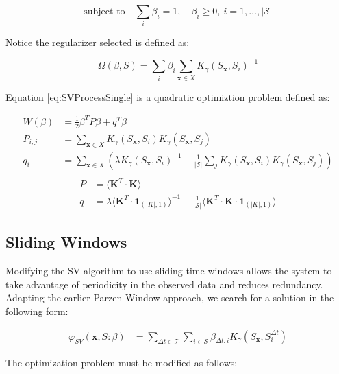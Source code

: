 \documentclass[10pt]{article}
\begin{document}
\begin{equation} \label{eq:SVProcessSingle} \text{subject to} \quad \sum_i \beta_i = 1, \quad \beta_i \ge 0, \ i=1,\hdots,|\mathcal{S}|
\end{equation}

Notice the regularizer selected is defined as:

\begin{equation}
\Omega(\beta,S) = \sum_i \beta_i \sum_{\mathbf{x} \in X} K_\gamma(S_{\mathbf{x}},S_i)^{-1}
\end{equation}

Equation \ref{eq:SVProcessSingle} is a quadratic optimiztion problem defined as:

\begin{align*}
W(\beta) &= \frac{1}{2} \beta^T P \beta + q^T \beta \\
P_{i,j} &= \sum_{\mathbf{x} \in X } K_\gamma(S_{\mathbf{x}},S_i) K_\gamma(S_{\mathbf{x}},S_j) \\
q_i &= \sum_{\mathbf{x} \in X } \left( \lambda K_\gamma(S_{\mathbf{x}},S_i)^{-1} - \frac{1}{|\mathcal{S}|} \sum_j K_\gamma(S_{\mathbf{x}},S_i) K_\gamma(S_{\mathbf{x}},S_j) \right) \\
\end{align*}
\begin{align}
P &= \langle \mathbf{K}^T \cdot \mathbf{K} \rangle  \label{eq:SVPSingle} \\
q &= \lambda \langle \mathbf{K}^T \cdot \mathbf{1}_{( |K|, 1 )} \rangle^{-1} - \frac{1}{ | \mathcal{S} | } \langle \mathbf{K}^T \cdot \mathbf{K} \cdot \mathbf{1}_{( |K|, 1 )} \rangle
\end{align}


\subsection{ Sliding Windows }

Modifying the SV algorithm to use sliding time windows allows the system to take advantage of periodicity in the observed data and reduces redundancy.  Adapting the earlier Parzen Window approach, we search for a solution in the following form:

\begin{align} \label{eq:SVResultSlidingSingle}
\varphi_{SV}( \mathbf{x}, S : \beta) &= \sum_{\Delta t \in \mathcal{T}} \sum_{i \in \mathcal{S}} \beta_{\Delta t, i} K_\gamma( S_\mathbf{x}, S_i^{\Delta t} ) 
\end{align}

The optimization problem must be modified as follows:
\end{document}
